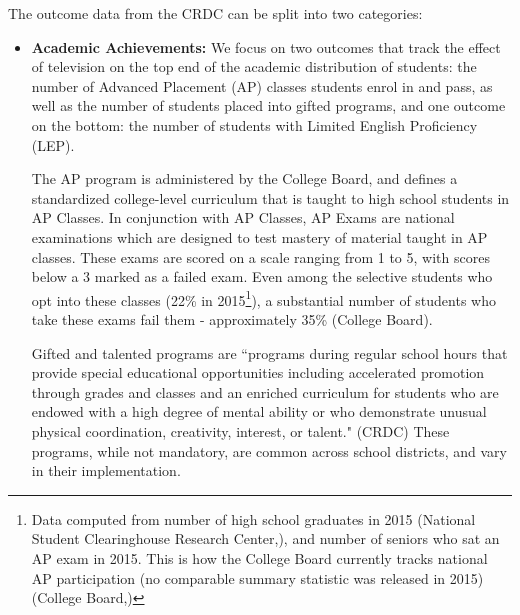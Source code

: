 \documentclass[11pt]{article}
\begin{document}
The outcome data from the CRDC can be split into two categories:
\begin{itemize}
\item \textbf{Academic Achievements:} We focus on two outcomes that track the effect of television on the top end of the academic distribution of students: the number of Advanced Placement (AP) classes students enrol in and pass, as well as the number of students placed into gifted programs, and one outcome on the bottom: the number of students with Limited English Proficiency (LEP).

The AP program is administered by the College Board, and defines a standardized college-level curriculum that is taught to high school students in AP Classes. In conjunction with AP Classes, AP Exams are national examinations which are designed to test mastery of material taught in AP classes. These exams are scored on a scale ranging from 1 to 5, with scores below a 3 marked as a failed exam. Even among the selective students who opt into these classes (22\% in 2015\footnote{ Data computed from number of high school graduates in 2015 (National Student Clearinghouse Research Center,\cite{noauthor_high_2015}), and number of seniors who sat an AP exam in 2015. This is how the College Board currently tracks national AP participation (no comparable summary statistic was released in 2015) (College Board,\cite{noauthor_ap_2015})}), a substantial number of students who take these exams fail them - approximately 35\% (College Board\cite{noauthor_ap_2020}). 

Gifted and talented programs are ``programs during regular school hours that provide special educational opportunities including accelerated promotion through grades and classes and an enriched curriculum for students who are endowed with a high degree of mental ability or who demonstrate unusual physical coordination, creativity, interest, or talent." (CRDC\cite{noauthor_master_2016}) These programs, while not mandatory, are common across school districts, and vary in their implementation. %


\end{itemize}
\end{document}
